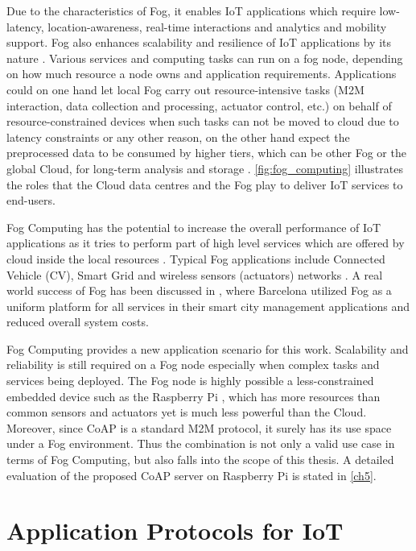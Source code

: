 Due to the characteristics of Fog, it enables IoT applications which require low-latency, location-awareness, real-time interactions and analytics and mobility support. Fog also enhances scalability and resilience of IoT applications by its nature \cite{7123563}. Various services and computing tasks can run on a fog node, depending on how much resource a node owns and application requirements. Applications could on one hand let local Fog carry out resource-intensive tasks (M2M interaction, data collection and processing, actuator control, etc.) on behalf of resource-constrained devices when such tasks can not be moved to cloud due to latency constraints or any other reason, on the other hand expect the preprocessed data to be consumed by higher tiers, which can be other Fog or the global Cloud, for long-term analysis and storage \cite{Bonomi:2012:FCR:2342509.2342513}\cite{7498684}. \autoref{fig:fog_computing} illustrates the roles that the Cloud data centres and the Fog play to deliver IoT services to end-users. 

Fog Computing has the potential to increase the overall performance of IoT applications as it tries to perform part of high level services which are offered by cloud inside the local resources \cite{7123563}. Typical Fog applications include Connected Vehicle (CV), Smart Grid and wireless sensors (actuators) networks \cite{Bonomi:2012:FCR:2342509.2342513}. A real world success of Fog has been discussed in \cite{7498684}, where Barcelona utilized Fog as a uniform platform for all services in their smart city management applications and reduced overall system costs.

Fog Computing provides a new application scenario for this work. Scalability and reliability is still required on a Fog node especially when complex tasks and services being deployed. The Fog node is highly possible a less-constrained embedded device such as the Raspberry Pi \cite{raspberry_pi}, which has more resources than common sensors and actuators yet is much less powerful than the Cloud. Moreover,  since CoAP is a standard M2M protocol, it surely has its use space under a Fog environment. Thus the combination is not only a valid use case in terms of Fog Computing, but also falls into the scope of this thesis. A detailed evaluation of the proposed CoAP server on Raspberry Pi is stated in \autoref{ch5}.

\section{Application Protocols for IoT} \label{IoT_protocols}

